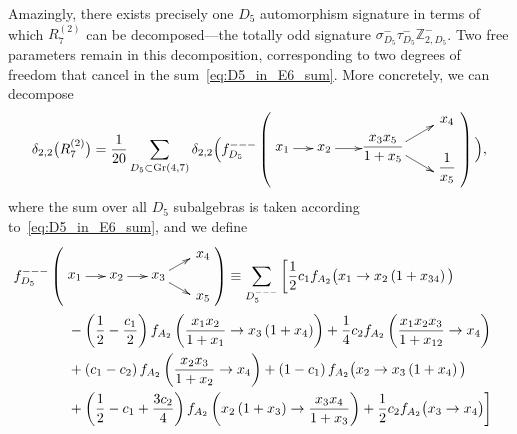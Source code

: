 \documentclass[12pt]{article}
\DeclareMathOperator{\Gr}{Gr}
\def\nl{\nonumber\\}
\begin{document}
Amazingly, there exists precisely one $D_5$ automorphism signature in terms of which $R_7^{(2)}$ can be decomposed---the totally odd signature $\sigma_{D_5}^- \tau_{D_5}^- \mathbb{Z}_{2,D_5}^-$. Two free parameters remain in this decomposition, corresponding to two degrees of freedom that cancel in the sum~\eqref{eq:D5_in_E6_sum}. More concretely, we can decompose 
\begin{align}
\delta_{2,2}\big(R^{(2)}_7 \big) = \frac{1}{20} \sum_{D_5\subset \Gr(4,7)} \delta_{2,2} \Big( f_{D_5}^{---}\left(
\begin{gathered}
    \begin{xy} 0;<1pt,0pt>:<0pt,-1pt>::
      (0,20) *+{x_1} ="1",
      (30,20) *+{x_2} ="2",
      (80,20) *+{\color{white} xxxxxxx} ="3",
      (114,0) *+{\color{white} x} ="4",
      (114,40) *+{\color{white} x} ="5",
      (72,20) *+{\begin{aligned} \frac{x_3 x_5}{1+x_5} \end{aligned}} ="6",
      (118,0) *+{x_4} ="7",
      (118,34) *+{\begin{aligned} \frac{1}{x_5}\end{aligned}} ="8",
      "1", {\ar"2"},
      "2", {\ar"3"},
      "3", {\ar"4"},
      "3", {\ar"5"},
    \end{xy}
\end{gathered}
\right) \Big), \label{eq:R27_D5_decomposition}
\end{align}
where the sum over all $D_5$ subalgebras is taken according to~\eqref{eq:D5_in_E6_sum}, and we define
\begin{align}\label{eq:fd5-init}
f_{D_5}^{---}\left(
\begin{gathered}
    \begin{xy} 0;<1pt,0pt>:<0pt,-1pt>::
      (0,15) *+{x_1} ="1",
      (30,15) *+{x_2} ="2",
      (60,15) *+{x_3} ="3",
      (90,-2) *+{\color{white} x_i} ="4",
      (90,32) *+{\color{white} x_i} ="5",
      (92,0) *+{x_4} ="6",
      (92,30) *+{x_5} ="7",
      "1", {\ar"2"},
      "2", {\ar"3"},
      "3", {\ar"4"},
      "3", {\ar"5"},
    \end{xy}
    \end{gathered} 
\right) &\equiv \sum_{D_5^{---}} \bigg[
	\frac{1}{2} c_1 f_{A_2}\big(x_1\to x_2 \left(1+x_{34}\right)\big)\nl
	&\hspace{-4cm} - \left(\frac{1}{2}-\frac{c_1}{2}\right) f_{A_2}\left(\frac{x_1 x_2}{1+x_1}\to x_3 \left(1+x_4\right)\right) + 
	\frac{1}{4} c_2 f_{A_2}\left(\frac{x_1 x_2 x_3}{1+x_{12}}\to x_4\right)\nl
	&\hspace{-4cm}+ \left(c_1-c_2\right) f_{A_2}\left(\frac{x_2 x_3}{1+x_2}\to x_4\right)+
	\left(1-c_1 \right) f_{A_2}\big(x_2\to x_3 \left(1+x_4\right)\big) \\
	&\hspace{-4cm}+ \left(\frac{1}{2}-c_1+\frac{3 c_2}{4}\right) f_{A_2}\left(x_2 \left(1+x_3\right)\to \frac{x_3 x_4}{1+x_3}\right) +
	\frac{1}{2} c_2 f_{A_2}\big(x_3\to x_4\big) \bigg] \nonumber
\end{align}
\end{document}
